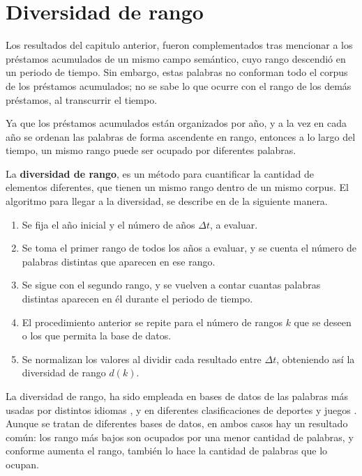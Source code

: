 \chapter{Diversidad de rango}
\label{cap.diversidad}

Los resultados del capitulo anterior, fueron complementados tras mencionar a los préstamos acumulados de un mismo campo semántico, cuyo rango descendió en un periodo de tiempo. Sin embargo, estas palabras no conforman todo el corpus de los préstamos acumulados; no se sabe lo que ocurre con el rango de los demás préstamos, al transcurrir el tiempo. 

Ya que los préstamos acumulados están organizados por año, y a la vez en cada año se ordenan las palabras de forma ascendente en rango, entonces a lo largo del tiempo, un mismo rango puede ser ocupado por diferentes palabras. 

La \textbf{diversidad de rango}, es un método para cuantificar la cantidad de elementos diferentes, que tienen un mismo rango dentro de un mismo corpus. El algoritmo para llegar a la diversidad, se describe en \cite{tesis.sergio} de la siguiente manera.


\begin{enumerate}
		
	\item Se fija el año inicial y el número de años $\Delta t$, a evaluar.
	
	\item Se toma el primer rango de todos los años a evaluar, y se cuenta el número de palabras distintas que aparecen en ese rango.  
	
	\item Se sigue con el segundo rango, y se vuelven a contar cuantas palabras distintas aparecen en él durante el periodo de tiempo. 
	
	\item El procedimiento anterior se repite para el número de rangos $k$ que se deseen o los que permita la base de datos. 
	
	\item Se normalizan los valores al dividir cada resultado entre $\Delta t$, obteniendo así la diversidad de rango $d(k)$.
	
\end{enumerate}

La diversidad de rango, ha sido empleada en bases de datos de las palabras más usadas por distintos idiomas \cite{iplosone}, y en diferentes clasificaciones de deportes y juegos \cite{epj}. Aunque se tratan de diferentes bases de datos, en ambos casos hay un resultado común: los rango más bajos son ocupados por una menor cantidad de palabras, y conforme aumenta el rango, también lo hace la cantidad de palabras que lo ocupan.

